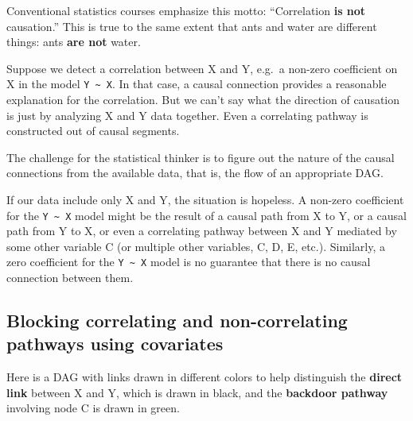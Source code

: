 \documentclass[
  letterpaper,
  DIV=11,
  numbers=noendperiod,
  oneside]{scrartcl}
\begin{document}
\begin{tcolorbox}[enhanced jigsaw, colbacktitle=quarto-callout-note-color!10!white, opacityback=0, breakable, opacitybacktitle=0.6, colback=white, coltitle=black, arc=.35mm, title=\textcolor{quarto-callout-note-color}{\faInfo}\hspace{0.5em}{Correlation \emph{is} causation}, left=2mm, colframe=quarto-callout-note-color-frame, rightrule=.15mm, bottomrule=.15mm, leftrule=.75mm, bottomtitle=1mm, toptitle=1mm, titlerule=0mm, toprule=.15mm]

Conventional statistics courses emphasize this motto: ``Correlation
\textbf{is not} causation.'' This is true to the same extent that ants
and water are different things: ants \textbf{are not} water.

Suppose we detect a correlation between X and Y, e.g.~a non-zero
coefficient on X in the model \texttt{Y\ \textasciitilde{}\ X}. In that
case, a causal connection provides a reasonable explanation for the
correlation. But we can't say what the direction of causation is just by
analyzing X and Y data together. Even a correlating pathway is
constructed out of causal segments.

The challenge for the statistical thinker is to figure out the nature of
the causal connections from the available data, that is, the flow of an
appropriate DAG.

If our data include only X and Y, the situation is hopeless. A non-zero
coefficient for the \texttt{Y\ \textasciitilde{}\ X} model might be the
result of a causal path from X to Y, or a causal path from Y to X, or
even a correlating pathway between X and Y mediated by some other
variable C (or multiple other variables, C, D, E, etc.). Similarly, a
zero coefficient for the \texttt{Y\ \textasciitilde{}\ X} model is no
guarantee that there is no causal connection between them.

\end{tcolorbox}

\subsection{Blocking correlating and non-correlating pathways using
covariates}\label{blocking-correlating-and-non-correlating-pathways-using-covariates}

Here is a DAG with links drawn in different colors to help distinguish
the \textbf{direct link} between X and Y, which is drawn in black, and
the \textbf{backdoor pathway} involving node C is drawn in green.
\end{document}
